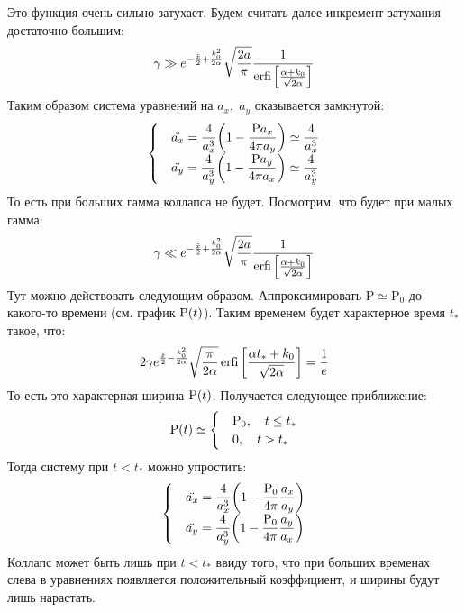 \documentclass[titlepage]{article}
\DeclareMathOperator\erfi{erfi}
\begin{document}
Это функция очень сильно затухает. Будем считать далее инкремент затухания достаточно большим:
\begin{equation}
\gamma \gg e^{-\frac{\tilde{x}}{2} + \frac{k_0^2}{2\alpha}} \sqrt{\dfrac{2a}{\pi}} \dfrac{1}{\erfi{\qty[\frac{\alpha + k_0}{\sqrt{2\alpha}}]}} 
\end{equation}
Таким образом система уравнений на $a_x,\; a_y$ оказывается замкнутой:
\begin{align}
 \begin{cases}
 &\ddot{a_x} = \dfrac{4}{a_x^3} \qty(1 - \dfrac{\mathrm{P} a_x}{4\pi a_y})\simeq \dfrac{4}{a_x^3}\\
 &\ddot{a_y} = \dfrac{4}{a_y^3} \qty(1 - \dfrac{\mathrm{P}a_y}{4\pi a_x}) \simeq \dfrac{4}{a_y^3}
 \end{cases}
\end{align}
То есть при больших гамма коллапса не будет. Посмотрим, что будет при малых гамма:
\begin{equation}
\gamma \ll e^{-\frac{\tilde{x}}{2} + \frac{k_0^2}{2\alpha}} \sqrt{\dfrac{2a}{\pi}} \dfrac{1}{\erfi{\qty[\frac{\alpha + k_0}{\sqrt{2\alpha}}]}} 
\end{equation}
Тут можно действовать следующим образом. Аппроксимировать $\mathrm{P} \simeq \mathrm{P_0}$ до какого-то времени (см. график $\mathrm{P}\qty(t)$). Таким временем будет характерное время $t_*$ такое, что:
\begin{equation}
 2\gamma e^{\frac{\tilde{x}}{2} - \frac{k_0^2}{2\alpha}} \sqrt{\frac{\pi}{2\alpha}}\erfi{\qty[\frac{\alpha t_* + k_0}{\sqrt{2\alpha}}]} = \dfrac{1}{e}
\end{equation}
То есть это характерная ширина $\mathrm{P}\qty(t)$. Получается следующее приближение:
\begin{gather}
 \mathrm{P}\qty(t) \simeq
 \begin{cases}
  &\mathrm{P_0},\quad {t} \leq t_*\\
  &0,\quad {t} > t_*
 \end{cases} 
\end{gather}
Тогда систему при $t < t_*$ можно упростить:
\begin{align}
 \begin{cases}
 &\ddot{a_x} = \dfrac{4}{a_x^3} \qty(1 - \dfrac{\mathrm{P_0}}{4\pi}\dfrac{a_x}{a_y})\\
 &\ddot{a_y} = \dfrac{4}{a_y^3} \qty(1 - \dfrac{\mathrm{P_0}}{4\pi} \dfrac{a_y}{a_x})
 \end{cases}
\end{align}
Коллапс может быть лишь при $t < t_*$ ввиду того, что при больших временах слева в уравнениях появляется положительный коэффициент, и ширины будут лишь нарастать.
\end{document}
